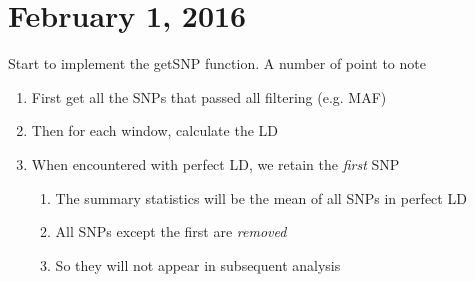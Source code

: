 \documentclass[12pt]{article}
\begin{document}
	\section*{February 1, 2016}
	Start to implement the getSNP function. 
	A number of point to note
	\begin{enumerate}
		\item First get all the SNPs that passed all filtering (e.g. MAF)
		\item Then for each window, calculate the LD
		\item When encountered with perfect LD, we retain the \emph{first} SNP
		\begin{enumerate}
			\item The summary statistics will be the mean of all SNPs in perfect LD
			\item All SNPs except the first are \emph{removed} 
			\item So they will not appear in subsequent analysis
		\end{enumerate}
	\end{enumerate}
\end{document}
